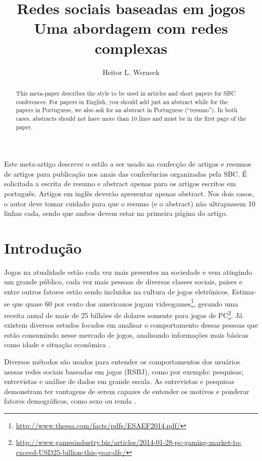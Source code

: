 \documentclass[12pt]{article}
\title{Redes sociais baseadas em jogos\\ Uma abordagem com redes complexas}
\author{Heitor L. Werneck\inst{1}}
\begin{document}
 

\maketitle

\begin{abstract}
  This meta-paper describes the style to be used in articles and short papers
  for SBC conferences. For papers in English, you should add just an abstract
  while for the papers in Portuguese, we also ask for an abstract in
  Portuguese (``resumo''). In both cases, abstracts should not have more than
  10 lines and must be in the first page of the paper.
\end{abstract}
     
\begin{resumo} 
  Este meta-artigo descreve o estilo a ser usado na confecção de artigos e
  resumos de artigos para publicação nos anais das conferências organizadas
  pela SBC. É solicitada a escrita de resumo e abstract apenas para os artigos
  escritos em português. Artigos em inglês deverão apresentar apenas abstract.
  Nos dois casos, o autor deve tomar cuidado para que o resumo (e o abstract)
  não ultrapassem 10 linhas cada, sendo que ambos devem estar na primeira
  página do artigo.
\end{resumo}


\section{Introdução}

Jogos na atualidade estão cada vez mais presentes na sociedade e vem atingindo um grande público, cada vez mais pessoas de diversas classes sociais, paises e entre outros fatores estão sendo incluidos na cultura de jogos eletrônicos. Estima-se que quase 60 por cento dos americanos jogam videogames\footnote{\url{http://www.theesa.com/facts/pdfs/ESAEF2014.pdf/}}, gerando uma receita anual de mais de 25 bilhões de dolares somente para jogos de PC\footnote{\url{http://www.gamesindustry.biz/articles/2014-01-28-pc-gaming-market-to-exceed-USD25-billion-this-year-dfc/}}. Já existem diversos estudos focados em analisar o comportamento dessas pessoas que estão consumindo nesse mercado de jogos, analisando informações mais básicas como idade e situação econômica \cite{williams2008plays,griffiths2003breaking,kowert2014unpopular}.

Diversos métodos são usados para entender os comportamentos dos usuários nessas redes sociais baseadas em jogos (RSBJ), como por exemplo: pesquisas; entrevistas e análise de dados em grande escala. As entrevistas e pesquisas demonstram ter vantagens de serem capazes de entender os motivos e ponderar fatores demográficos, como sexo ou renda \cite{yee2006demographics,yee2006motivations}.
\end{document}
